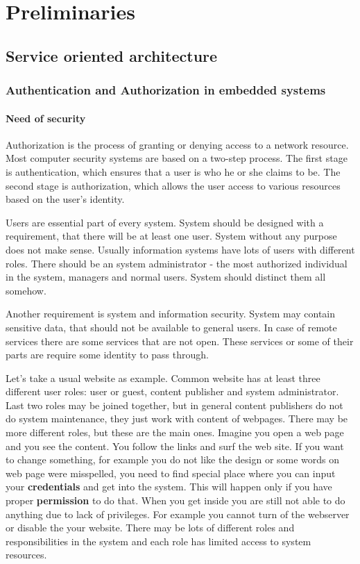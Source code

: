 \newpage
\section{Preliminaries}

\subsection{Service oriented architecture}

\subsubsection{Authentication and Authorization in embedded systems}
\paragraph{Need of security}
Authorization is the process of granting or denying access to a network resource.
Most computer security systems are based on a two-step process.
The first stage is authentication, which ensures that a user is who he or she claims to be.
The second stage is authorization, which allows the user access to various resources based on the user's identity. 

Users are essential part of every system. System should be designed with
a requirement, that there will be at least one user. System without any purpose
does not make sense. Usually information systems have lots of users with
different roles. There should be an system administrator - the most authorized individual
in the system, managers and normal users. System should distinct them all
somehow. 

Another requirement is system and information security. System may contain
sensitive data, that should not be available to general users. In case of remote
services there are some services that are not open. These services or some
of their parts are require some identity to pass through. 

Let's take a usual website as example. Common website has at least three
different user roles:
user or guest, content publisher and system administrator. Last two roles may be
joined together, but in general content publishers do not do system maintenance, they
just work with content of webpages. There may be more different roles, but these
are the main ones. Imagine you open a web page and you see the content. You
follow the links and surf the web site. If you want to change something, for
example you do not like the design or some words on web page were misspelled,
you need to find special place where you can input your \textbf{credentials} and
get into the system. This will happen only if you have proper
\textbf{permission} to do that. When you get inside you are still not able to do
anything due to lack of privileges. For example you cannot turn of the
webserver or disable the your website. There may be lots of different roles and
responsibilities in the system and each role has limited access to system
resources.

